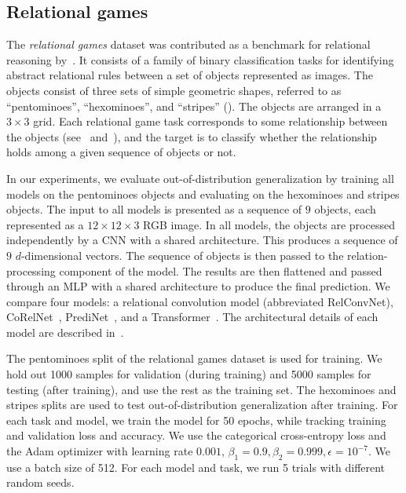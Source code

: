 \subsection{Relational games}

The \textit{relational games} dataset was contributed as a benchmark for relational reasoning by~\citep{shanahanExplicitlyRelationalNeural}. It consists of a family of binary classification tasks for identifying abstract relational rules between a set of objects represented as images. The objects consist of three sets of simple geometric shapes, referred to as ``pentominoes'', ``hexominoes'', and ``stripes'' (). The objects are arranged in a $3 \times 3$ grid. Each relational game task corresponds to some relationship between the objects (see~ and~), and the target is to classify whether the relationship holds among a given sequence of objects or not.

In our experiments, we evaluate out-of-distribution generalization by training all models on the pentominoes objects and evaluating on the hexominoes and stripes objects. The input to all models is presented as a sequence of $9$ objects, each represented as a $12 \times 12 \times 3$ RGB image. In all models, the objects are processed independently by a CNN with a shared architecture. This produces a sequence of $9$ $d$-dimensional vectors. The sequence of objects is then passed to the relation-processing component of the model. The results are then flattened and passed through an MLP with a shared architecture to produce the final prediction. We compare four models: a relational convolution model (abbreviated RelConvNet), CoRelNet~\citep{kergNeuralArchitecture2022}, PrediNet~\citep{shanahanExplicitlyRelationalNeural}, and a Transformer~\citep{vaswani2017attention}. The architectural details of each model are described in~.

The pentominoes split of the relational games dataset is used for training. We hold out 1000 samples for validation (during training) and 5000 samples for testing (after training), and use the rest as the training set. The hexominoes and stripes splits are used to test out-of-distribution generalization after training. For each task and model, we train the model for 50 epochs, while tracking training and validation loss and accuracy. We use the categorical cross-entropy loss and the Adam optimizer with learning rate $0.001$, $\beta_1 = 0.9, \beta_2 = 0.999, \epsilon = 10^{-7}$. We use a batch size of 512. For each model and task, we run 5 trials with different random seeds.

